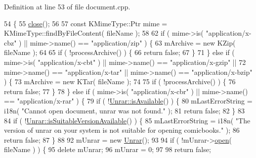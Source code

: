 Definition at line 53 of file document.\+cpp.


\begin{DoxyCode}
54 \{
55     \hyperlink{classComicBook_1_1Document_ae9b8bb9ab6fbf42f47b573e95a5a1198}{close}();
56 
57     \textcolor{keyword}{const} KMimeType::Ptr mime = KMimeType::findByFileContent( fileName );
58 
62     \textcolor{keywordflow}{if} ( mime->is( \textcolor{stringliteral}{"application/x-cbz"} ) || mime->name() == \textcolor{stringliteral}{"application/zip"} ) \{
63         mArchive = \textcolor{keyword}{new} KZip( fileName );
64 
65         \textcolor{keywordflow}{if} ( !processArchive() ) \{
66             \textcolor{keywordflow}{return} \textcolor{keyword}{false};
67         \}
71     \} \textcolor{keywordflow}{else} \textcolor{keywordflow}{if} ( mime->is( \textcolor{stringliteral}{"application/x-cbt"} ) || mime->name() == \textcolor{stringliteral}{"application/x-gzip"} ||
72                 mime->name() == \textcolor{stringliteral}{"application/x-tar"} || mime->name() == \textcolor{stringliteral}{"application/x-bzip"} ) \{
73         mArchive = \textcolor{keyword}{new} KTar( fileName );
74 
75         \textcolor{keywordflow}{if} ( !processArchive() ) \{
76             \textcolor{keywordflow}{return} \textcolor{keyword}{false};
77         \}
78     \} \textcolor{keywordflow}{else} \textcolor{keywordflow}{if} ( mime->is( \textcolor{stringliteral}{"application/x-cbr"} ) || mime->name() == \textcolor{stringliteral}{"application/x-rar"} ) \{
79         \textcolor{keywordflow}{if} ( !\hyperlink{classUnrar_a2e97c9cb1a32bba23e7df17806668ba2}{Unrar::isAvailable}() ) \{
80             mLastErrorString = i18n( \textcolor{stringliteral}{"Cannot open document, unrar was not found."} );
81             \textcolor{keywordflow}{return} \textcolor{keyword}{false};
82         \}
83 
84         \textcolor{keywordflow}{if} ( !\hyperlink{classUnrar_a142581395536a82553f2855962e14055}{Unrar::isSuitableVersionAvailable}() ) \{
85             mLastErrorString = i18n( \textcolor{stringliteral}{"The version of unrar on your system is not suitable for opening
       comicbooks."} );
86             \textcolor{keywordflow}{return} \textcolor{keyword}{false};
87         \}
88 
92         mUnrar = \textcolor{keyword}{new} \hyperlink{classUnrar}{Unrar}();
93 
94         \textcolor{keywordflow}{if} ( !mUnrar->\hyperlink{classUnrar_ad3e0aa6e1af9ecd001781c24422ca531}{open}( fileName ) ) \{
95             \textcolor{keyword}{delete} mUnrar;
96             mUnrar = 0;
97 
98             \textcolor{keywordflow}{return} \textcolor{keyword}{false};

\end{DoxyCode}
